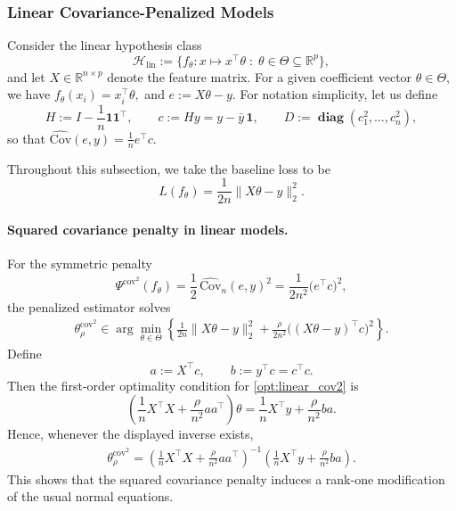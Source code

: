 \documentclass[12pt]{article}
\theoremstyle{plain}
\theoremstyle{definition}
\newcommand{\R}{\mathbb{R}}
\newcommand{\1}{\mathbf{1}}
\newcommand{\Cov}{\text{Cov}}
\renewcommand{\H}{\mathcal{H}}
\renewcommand{\R}{\mathbb{R}}
\newcommand{\diag}{\mathbf{\operatorname{diag}}}
\begin{document}

\subsubsection{Linear Covariance-Penalized Models}
\label{subsec:linear_models}

Consider the linear hypothesis class
\[
\H_{\mathrm{lin}} := \{f_\theta : x \mapsto x^\top \theta \;:\; \theta \in \Theta \subseteq \R^p\},
\]
and let $X \in \R^{n\times p}$ denote the feature matrix. For a given coefficient vector $\theta \in \Theta$, we have
$
f_\theta(x_i) = x_i^\top \theta,
$ and $
e := X\theta - y.
$ 
For notation simplicity, let us define
\[
H := I - \frac{1}{n}\mathbf{1}\mathbf{1}^\top,
\qquad
c := Hy = y - \bar y\,\mathbf{1},
\qquad
D := \diag(c_1^2,\dots,c_n^2),
\]
so that
$
\widehat{\Cov}(e,y)
=
\frac{1}{n}e^\top c.
$ 

Throughout this subsection, we take the baseline loss to be
\[
L(f_\theta) = \frac{1}{2n}\|X\theta-y\|_2^2.
\]

\paragraph{Squared covariance penalty in linear models.}
For the symmetric penalty
\[
\Psi^{\mathrm{cov}^2}(f_\theta)
=
\frac{1}{2}\,\widehat{\Cov}_n(e,y)^2
=
\frac{1}{2n^2}\bigl(e^\top c\bigr)^2,
\]
the penalized estimator solves
\begin{align}
    \label{opt:linear_cov2}
    \theta_{\rho}^{\mathrm{cov}^2}
    \in
    \arg\min_{\theta\in\Theta}
    \left\{
        \frac{1}{2n}\|X\theta-y\|_2^2
        +
        \frac{\rho}{2n^2}\bigl((X\theta-y)^\top c\bigr)^2
    \right\}.
\end{align}
Define
\[
a := X^\top c,
\qquad
b := y^\top c = c^\top c.
\]
Then the first-order optimality condition for \eqref{opt:linear_cov2} is
\[
\left(
\frac{1}{n}X^\top X + \frac{\rho}{n^2}aa^\top
\right)\theta
=
\frac{1}{n}X^\top y + \frac{\rho}{n^2}ba.
\]
Hence, whenever the displayed inverse exists,
\begin{align}
    \label{eq:linear_cov2_closed_form}
    \theta_{\rho}^{\mathrm{cov}^2}
    =
    \left(
        \frac{1}{n}X^\top X
        +
        \frac{\rho}{n^2}aa^\top
    \right)^{-1}
    \left(
        \frac{1}{n}X^\top y
        +
        \frac{\rho}{n^2}ba
    \right).
\end{align}
This shows that the squared covariance penalty induces a rank-one modification of the usual normal equations.
\end{document}
